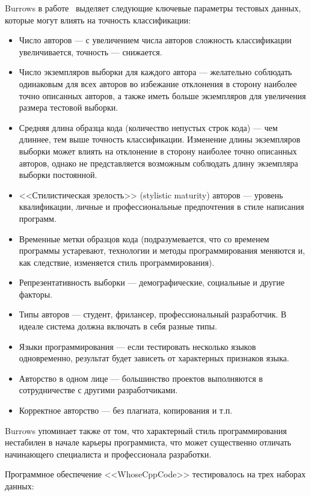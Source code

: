 Burrows в работе~\cite{burrows_big} выделяет следующие ключевые параметры тестовых данных,
которые могут влиять на точность классификации:

\begin{itemize}
 \item Число авторов --- с увеличением числа авторов сложность классификации увеличивается, 
 точность --- снижается.
 \item Число экземпляров выборки для каждого автора --- желательно соблюдать одинаковым для всех авторов во 
 избежание отклонения в сторону наиболее точно описанных авторов, а также иметь больше экземпляров 
 для увеличения размера тестовой выборки. 
 \item Средняя длина образца кода (количество непустых строк кода) --- чем длиннее, тем выше точность
 классификации. Изменение длины экземпляров выборки может влиять на отклонение в сторону наиболее 
 точно описанных авторов, однако не представляется возможным соблюдать длину экземпляра выборки постоянной.
 \item <<Стилистическая зрелость>> (stylistic maturity) авторов --- уровень квалификации, 
 личные и профессиональные предпочтения в стиле написания программ.
 \item Временные метки образцов кода (подразумевается, что со временем программы устаревают, технологии
 и методы программирования меняются и, как следствие, изменяется стиль программирования).
 \item Репрезентативность выборки --- демографические, социальные и другие факторы.
 \item Типы авторов --- студент, фрилансер, профессиональный разработчик. 
 В идеале система должна включать в себя разные типы.
 \item Языки программирования --- если тестировать несколько языков одновременно, 
 результат будет зависеть от характерных признаков языка.
 \item Авторство в одном лице --- большинство проектов выполняются в 
 сотрудничестве с другими разработчиками.
 \item Корректное авторство --- без плагиата, копирования и т.п.
\end{itemize}

Burrows упоминает также от том, что характерный стиль программирования нестабилен в начале карьеры программиста,
что может существенно отличать начинающего специалиста и профессионала разработки.

Программное обеспечение <<WhoseCppCode>> тестировалось на трех наборах данных:

